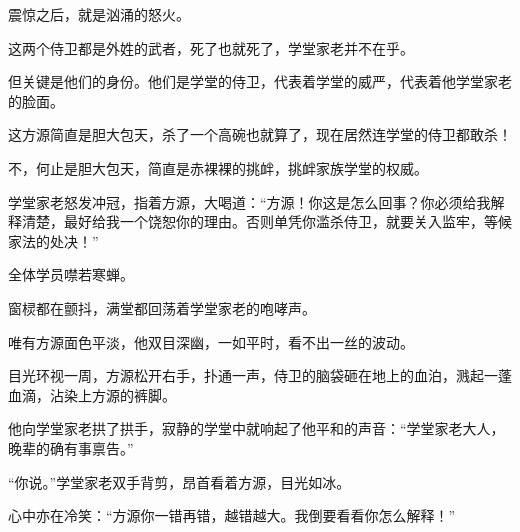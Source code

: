 \begin{this_body}
震惊之后，就是汹涌的怒火。

这两个侍卫都是外姓的武者，死了也就死了，学堂家老并不在乎。

但关键是他们的身份。他们是学堂的侍卫，代表着学堂的威严，代表着他学堂家老的脸面。

这方源简直是胆大包天，杀了一个高碗也就算了，现在居然连学堂的侍卫都敢杀！

不，何止是胆大包天，简直是赤裸裸的挑衅，挑衅家族学堂的权威。

学堂家老怒发冲冠，指着方源，大喝道：“方源！你这是怎么回事？你必须给我解释清楚，最好给我一个饶恕你的理由。否则单凭你滥杀侍卫，就要关入监牢，等候家法的处决！”

全体学员噤若寒蝉。

窗棂都在颤抖，满堂都回荡着学堂家老的咆哮声。

唯有方源面色平淡，他双目深幽，一如平时，看不出一丝的波动。

目光环视一周，方源松开右手，扑通一声，侍卫的脑袋砸在地上的血泊，溅起一蓬血滴，沾染上方源的裤脚。

他向学堂家老拱了拱手，寂静的学堂中就响起了他平和的声音：“学堂家老大人，晚辈的确有事禀告。”

“你说。”学堂家老双手背剪，昂首看着方源，目光如冰。

心中亦在冷笑：“方源你一错再错，越错越大。我倒要看看你怎么解释！”

\end{this_body}

